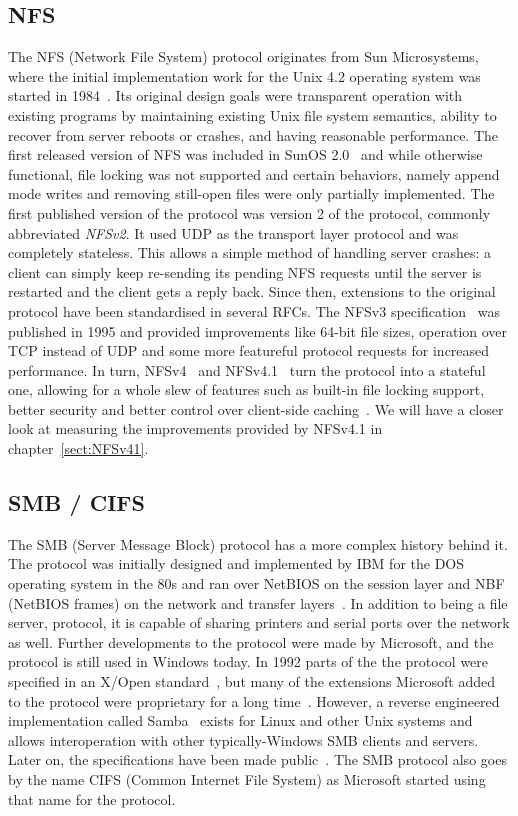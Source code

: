 \subsection{NFS}

The NFS (Network File System) protocol originates from Sun Microsystems, where the initial implementation work for the
Unix 4.2 operating system was started in 1984~\cite{NFS}. Its original design goals were
transparent operation with existing programs by maintaining existing Unix file system
semantics, ability to recover from server reboots or crashes, and having reasonable
performance.
The first released version of NFS was included in SunOS 2.0~\cite{SolarisBook}
and while otherwise functional,
file locking was not supported and certain behaviors,
namely append mode writes and removing still-open files were only partially implemented.
The first published version of the protocol was version 2 of the protocol, commonly abbreviated \emph{NFSv2}.
It used UDP as the transport layer protocol and was completely stateless.
This allows a simple method of handling server crashes: a client can simply keep re-sending
its pending NFS requests until the server is restarted and the client gets a reply back.
Since then, extensions to the original protocol have been standardised
in several RFCs.
The NFSv3 specification~\cite{NFSv3RFC} was published in 1995 and provided improvements
like 64-bit file sizes, operation over TCP instead of UDP and some more featureful protocol
requests for increased performance.
In turn, NFSv4~\cite{NFSv4RFC} and NFSv4.1~\cite{NFSv41RFC} turn the protocol into a stateful one,
allowing for a whole slew of features such as built-in file locking support, better security
and better control over client-side caching~\cite{NFSv4Better}.
We will have a closer look at measuring the improvements provided by NFSv4.1 in chapter~\ref{sect:NFSv41}.

\subsection{SMB / CIFS}

The SMB (Server Message Block) protocol has a more complex history behind it.
The protocol was initially designed and implemented by IBM for the DOS operating system in the 80s
and ran over NetBIOS on the session layer and NBF (NetBIOS frames) on the network and transfer layers~\cite{CifsBook}.
In addition to being a file server, protocol, it is capable of sharing printers and serial ports over the network as well.
Further developments to the protocol were made by Microsoft,
and the protocol is still used in Windows today.
In 1992 parts of the the protocol were specified in an X/Open standard~\cite{XopenSmbSpec},
but many of the extensions Microsoft added to the protocol were proprietary for a long time~\cite{SambaWritten}.
However, a reverse engineered implementation called Samba~\cite{SambaWritten} exists for Linux and other Unix systems and allows interoperation with other typically-Windows SMB clients and servers.
Later on, the specifications have been made public~\cite{MsCIFS}.
The SMB protocol also goes by the name CIFS (Common Internet File System)
as Microsoft started using that name for the protocol.

